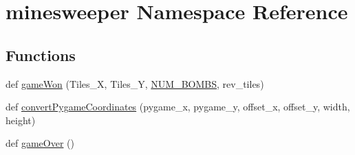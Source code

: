 \hypertarget{namespaceminesweeper}{}\section{minesweeper Namespace Reference}
\label{namespaceminesweeper}
\subsection*{Functions}
\begin{DoxyCompactItemize}
\item 
def \mbox{\hyperlink{namespaceminesweeper_a2be5f774bd929fda843bb947c8204607}{game\+Won}} (Tiles\+\_\+X, Tiles\+\_\+Y, \mbox{\hyperlink{namespaceminesweeper_aec391623def4c70333b6f270b23e4dcd}{N\+U\+M\+\_\+\+B\+O\+M\+BS}}, rev\+\_\+tiles)
\item 
def \mbox{\hyperlink{namespaceminesweeper_a73d5ef833018e322089c59ae52ef8aa1}{convert\+Pygame\+Coordinates}} (pygame\+\_\+x, pygame\+\_\+y, offset\+\_\+x, offset\+\_\+y, width, height)
\item 
def \mbox{\hyperlink{namespaceminesweeper_a6e2c2ee2c912ecebb7e255ba9d424bd9}{game\+Over}} ()
\end{DoxyCompactItemize}
